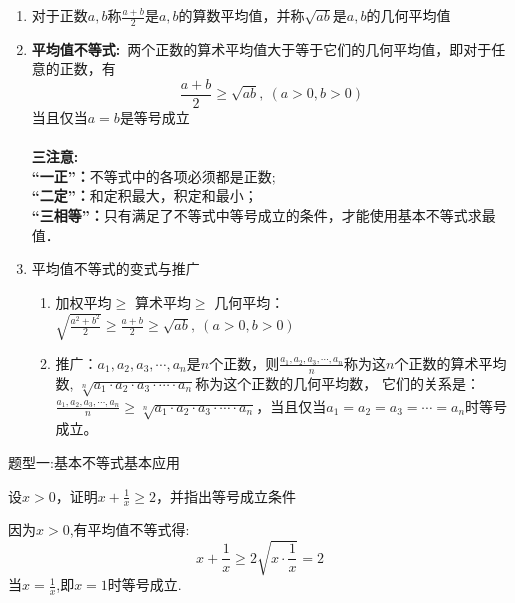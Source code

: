 \documentclass[10pt,a4paper]{ctexbook}
\begin{document}
\begin{enumerate}
    \item 对于正数$a,b$称$\displaystyle \frac{a+b}{2}\text{是}a,b\text{的算数平均值，并称}\sqrt{ab}\text{是}a,b\text{的几何平均值}$

    \item {\large{\textbf{平均值不等式:}}}\ 两个正数的算术平均值大于等于它们的几何平均值，即对于任意的正数，有
    $$
    \frac{a+b}{2}\ge \sqrt{ab},\ (a>0,b>0)
    $$
    当且仅当$a=b$是等号成立\\
    \\
    {\large{\textbf{三注意:}}}\\
    {\large{\textbf{“一正”：}}}不等式中的各项必须都是正数; \\
    {\large{\textbf{“二定”：}}}和定积最大，积定和最小； \\
    {\large{\textbf{“三相等”：}}}只有满足了不等式中等号成立的条件，才能使用基本不等式求最值．\\
    \item 平均值不等式的变式与推广
    \begin{enumerate}
        \item 加权平均$\ge$ 算术平均$\ge$ 几何平均：$\displaystyle \sqrt{\frac{a^2+b^2}{2}}\ge \frac{a+b}{2} \ge \sqrt{ab} , \ (a>0,b>0)$
    
        \item { 推广：$ a_1,a_2,a_3,\cdots,a_n$是$n$个正数，则$\displaystyle \frac{a_1,a_2,a_3,\cdots,a_n}{n}$称为这$n$个正数的算术平均数,
        $\sqrt[n]{a_1\cdot a_2\cdot a_3\cdot \cdots \cdot a_n}$称为这个正数的几何平均数，
        它们的关系是：$\displaystyle \frac{a_1,a_2,a_3,\cdots,a_n}{n} \ge \sqrt[n]{a_1\cdot a_2\cdot a_3\cdot \cdots \cdot a_n}$，当且仅当$  a_1=a_2=a_3=\cdots=a_n$时等号成立。}
    \end{enumerate}
\end{enumerate}


\begin{tcolorbox} 
题型一:基本不等式基本应用
\end{tcolorbox}
\par
\begin{problem}
    设$x>0$，证明$\displaystyle x+\frac{1}{x} \ge 2$，并指出等号成立条件
    \begin{jiexi}
        因为$x>0$,有平均值不等式得:
        $$x+\frac{1}{x} \ge 2\sqrt{x\cdot\frac{1}{x}} = 2$$
        当$x=\frac{1}{x}$,即$x=1$时等号成立.
    \end{jiexi}
\end{problem}
\end{document}
